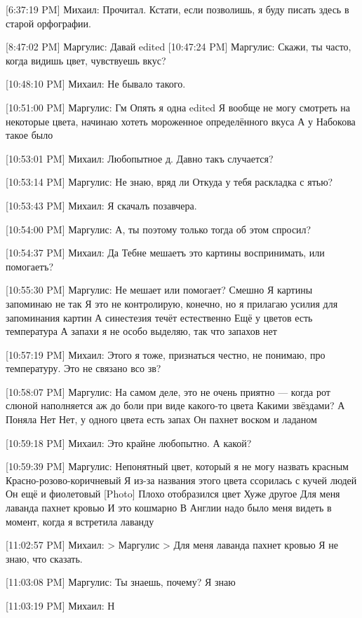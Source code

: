 \documentclass{article}
\newcommand{\yat}{{\fontencoding{X2}\selectfont\cyryat}} %
\begin{document}
{[6:37:19 PM] Михаил:
Прочитал.
 Кстати, если позволишь, я буду писать здесь в старой орфографии.

[8:47:02 PM] Маргулис:
Давай
edited 
[10:47:24 PM] Маргулис:
Скажи, ты часто, когда видишь цвет, чувствуешь вкус?

[10:48:10 PM] Михаил:
Не бывало такого.

[10:51:00 PM] Маргулис:
Гм
 Опять я одна
edited 
Я вообще не могу смотреть на некоторые цвета, начинаю хотеть мороженное определённого вкуса
 А у Набокова такое было

[10:53:01 PM] Михаил:
Любопытное д. Давно такъ случается?

[10:53:14 PM] Маргулис:
Не знаю, вряд ли
 Откуда у тебя раскладка с ятью?

[10:53:43 PM] Михаил:
Я скачалъ позавчера.

[10:54:00 PM] Маргулис:
А, ты поэтому только тогда об этом спросил?

[10:54:37 PM] Михаил:
Да
 Теб\yat не мешаетъ это картины воспринимать, или помогаетъ?

[10:55:30 PM] Маргулис:
Не мешает или помогает?
 Смешно
 Я картины запоминаю не так
 Я это не контролирую, конечно, но я прилагаю усилия для запоминания картин
 А синестезия течёт естественно
 Ещё у цветов есть температура
 А запахи я не особо выделяю, так что запахов нет

[10:57:19 PM] Михаил:
Этого я тоже, признаться честно, не понимаю, про температуру.
 Это не связано в со зв?

[10:58:07 PM] Маргулис:
На самом деле, это не очень приятно — когда рот слюной наполняется аж до боли при виде какого-то цвета
 Какими звёздами?
 А
 Поняла
 Нет
 Нет, у одного цвета есть запах
 Он пахнет воском и ладаном

[10:59:18 PM] Михаил:
Это крайне любопытно. А какой?

[10:59:39 PM] Маргулис:
Непонятный цвет, который я не могу назвать красным
 Красно-розово-коричневый
 Я из-за названия этого цвета ссорилась с кучей людей
 Он ещё и фиолетовый
 [Photo]
 Плохо отобразился цвет
 Хуже другое
 Для меня лаванда пахнет кровью
 И это кошмарно
 В Англии надо было меня видеть в момент, когда я встретила лаванду

[11:02:57 PM] Михаил:
> Маргулис
> Для меня лаванда пахнет кровью
Я не знаю, что сказать.

[11:03:08 PM] Маргулис:
Ты знаешь, почему?
 Я знаю

[11:03:19 PM] Михаил:
Н

}
\end{document}
